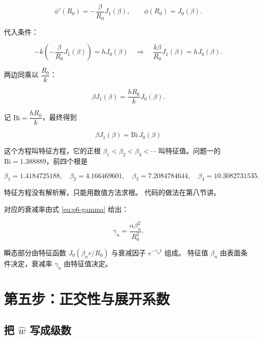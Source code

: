 \begin{equation}
\phi'(R_0)=-\frac{\beta}{R_0}J_1(\beta),
\qquad
\phi(R_0)=J_0(\beta).
\end{equation}

代入条件：

\begin{equation}
-k\left(-\frac{\beta}{R_0}J_1(\beta)\right)=h J_0(\beta)
\quad\Longrightarrow\quad
\frac{k\beta}{R_0}J_1(\beta)=h J_0(\beta).
\end{equation}

两边同乘以 $\dfrac{R_0}{k}$：

\begin{equation}
\beta J_1(\beta)=\frac{hR_0}{k}J_0(\beta).
\end{equation}

记 $\mathrm{Bi}=\dfrac{hR_0}{k}$，最终得到

\begin{equation}
\boxed{\ \beta J_1(\beta)=\mathrm{Bi}\,J_0(\beta)\ }
\label{eq:p6-eig}
\end{equation}

这个方程叫特征方程，它的正根 $\beta_1<\beta_2<\beta_3<\cdots$
叫特征值。问题一的 $\mathrm{Bi}=1.388889$，前四个根是

\begin{equation}
\beta_1=1.4184725188,\quad
\beta_2=4.166469601,\quad
\beta_3=7.2084784644,\quad
\beta_4=10.3082731535 .
\label{eq:p6-betan}
\end{equation}

特征方程没有解析解，只能用数值方法求根。
代码的做法在第八节讲。

对应的衰减率由式 \eqref{eq:p6-gamma} 给出：

\begin{equation}
\gamma_n=\frac{\alpha\beta_n^2}{R_0^2}.
\label{eq:p6-gamman}
\end{equation}

\begin{keypoint}
瞬态部分由特征函数 $J_0(\beta_n r/R_0)$ 与衰减因子 $e^{-\gamma_n t}$ 组成。
特征值 $\beta_n$ 由表面条件决定，衰减率 $\gamma_n$ 由特征值决定。
\end{keypoint}

\section{第五步：正交性与展开系数}

\subsection{把 $\hat w$ 写成级数}

